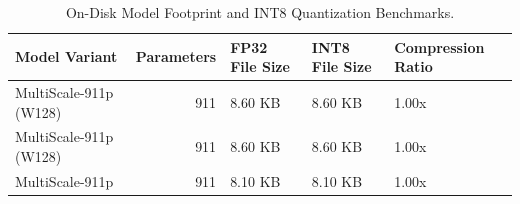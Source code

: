 \begin{table}
\caption{On-Disk Model Footprint and INT8 Quantization Benchmarks.}
\begin{tabular}{lrlll}
\toprule
Model Variant & Parameters & FP32 File Size & INT8 File Size & Compression Ratio \\
\midrule
MultiScale-911p (W128) & 911 & 8.60 KB & 8.60 KB & 1.00x \\
MultiScale-911p (W128) & 911 & 8.60 KB & 8.60 KB & 1.00x \\
MultiScale-911p & 911 & 8.10 KB & 8.10 KB & 1.00x \\
\bottomrule
\end{tabular}
\end{table}
